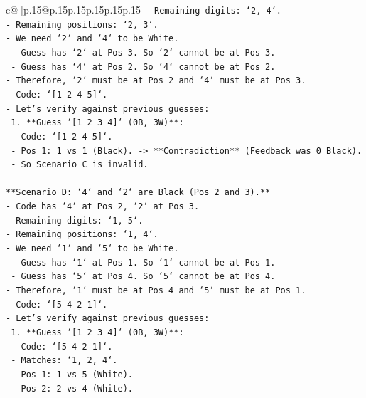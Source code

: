 \documentclass{article}
\begin{document}
{\begin{supertabular}{c@{$\;$}|p{.15\linewidth}@{}p{.15\linewidth}p{.15\linewidth}p{.15\linewidth}p{.15\linewidth}p{.15\linewidth}}
{{{\texttt{{-} Remaining digits: `2, 4`.} \\
\texttt{{-} Remaining positions: `2, 3`.} \\
\texttt{{-} We need `2` and `4` to be White.} \\
\texttt{    {-} Guess has `2` at Pos 3. So `2` cannot be at Pos 3.} \\
\texttt{    {-} Guess has `4` at Pos 2. So `4` cannot be at Pos 2.} \\
\texttt{{-} Therefore, `2` must be at Pos 2 and `4` must be at Pos 3.} \\
\texttt{{-} Code: `{[}1 2 4 5{]}`.} \\
\texttt{{-} Let's verify against previous guesses:} \\
\texttt{    1.  **Guess `{[}1 2 3 4{]}` (0B, 3W)**:} \\
\texttt{        {-} Code: `{[}1 2 4 5{]}`.} \\
\texttt{        {-} Pos 1: 1 vs 1 (Black). {-}> **Contradiction** (Feedback was 0 Black).} \\
\texttt{    {-} So Scenario C is invalid.} \\
\\ 
\texttt{**Scenario D: `4` and `2` are Black (Pos 2 and 3).**} \\
\texttt{{-} Code has `4` at Pos 2, `2` at Pos 3.} \\
\texttt{{-} Remaining digits: `1, 5`.} \\
\texttt{{-} Remaining positions: `1, 4`.} \\
\texttt{{-} We need `1` and `5` to be White.} \\
\texttt{    {-} Guess has `1` at Pos 1. So `1` cannot be at Pos 1.} \\
\texttt{    {-} Guess has `5` at Pos 4. So `5` cannot be at Pos 4.} \\
\texttt{{-} Therefore, `1` must be at Pos 4 and `5` must be at Pos 1.} \\
\texttt{{-} Code: `{[}5 4 2 1{]}`.} \\
\texttt{{-} Let's verify against previous guesses:} \\
\texttt{    1.  **Guess `{[}1 2 3 4{]}` (0B, 3W)**:} \\
\texttt{        {-} Code: `{[}5 4 2 1{]}`.} \\
\texttt{        {-} Matches: `1, 2, 4`.} \\
\texttt{        {-} Pos 1: 1 vs 5 (White).} \\
\texttt{        {-} Pos 2: 2 vs 4 (White).} \\
}}}
\end{supertabular}}
\end{document}
